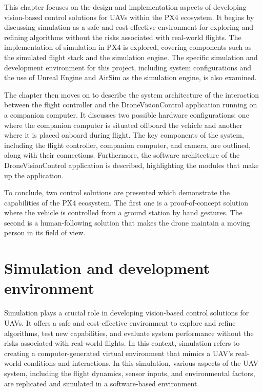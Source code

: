 This chapter focuses on the design and implementation aspects of developing vision-based control solutions for UAVs within the PX4 ecosystem. It begins by discussing simulation as a safe and cost-effective environment for exploring and refining algorithms without the risks associated with real-world flights. The implementation of simulation in PX4 is explored, covering components such as the simulated flight stack and the simulation engine. The specific simulation and development environment for this project, including system configurations and the use of Unreal Engine and AirSim as the simulation engine, is also examined.

The chapter then moves on to describe the system architecture of the interaction between the flight controller and the DroneVisionControl application running on a companion computer. It discusses two possible hardware configurations: one where the companion computer is situated offboard the vehicle and another where it is placed onboard during flight. The key components of the system, including the flight controller, companion computer, and camera, are outlined, along with their connections. Furthermore, the software architecture of the DroneVisionControl application is described, highlighting the modules that make up the application.

To conclude, two control solutions are presented which demonstrate the capabilities of the PX4 ecosystem. The first one is a proof-of-concept solution where the vehicle is controlled from a ground station by hand gestures. The second is a human-following solution that makes the drone maintain a moving person in its field of view.

\section{Simulation and development environment}
\label{sec:devenv}
Simulation plays a crucial role in developing vision-based control solutions for UAVs. It offers a safe and cost-effective environment to explore and refine algorithms, test new capabilities, and evaluate system performance without the risks associated with real-world flights. 
In this context, simulation refers to creating a computer-generated virtual environment that mimics a UAV's real-world conditions and interactions. In this simulation, various aspects of the UAV system, including the flight dynamics, sensor inputs, and environmental factors, are replicated and simulated in a software-based environment.


